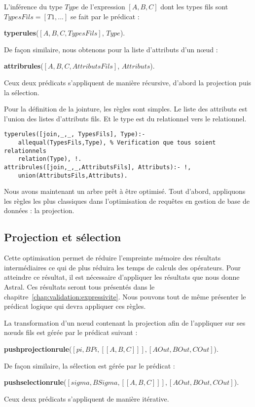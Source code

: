 \begin{regle}
L'inférence du type $Type$ de l'expression $[A,B,C]$ dont les types fils sont $TypesFils=[T1,...]$ se fait par le prédicat :
\begin{center} \textbf{typerules}($[A,B,C,TypesFils]$, $Type$).\end{center}
De façon similaire, nous obtenons pour la liste d'attributs d'un nœud :
\begin{center} \textbf{attribrules}($[A,B,C,AttributsFils]$, $Attributs$).\end{center}
Ceux deux prédicats s'appliquent de manière récursive, d'abord la projection puis la sélection.
\end{regle}


\begin{example}
	Pour la définition de la jointure, les règles sont simples. Le liste des attributs est l'union des listes d'attributs fils. Et le type est du relationnel vers le relationnel.
	\begin{lstlisting}
typerules([join,_,_, TypesFils], Type):- 
	allequal(TypesFils,Type), % Verification que tous soient relationnels 
	relation(Type), !.
attribrules([join,_,_,AttributsFils], Attributs):- !, 
	union(AttributsFils,Attributs).
	\end{lstlisting}
\end{example}

Nous avons maintenant un arbre prêt à être optimisé. Tout d'abord, appliquons les règles les plus classiques dans l'optimisation de requêtes en gestion de base de données : la projection.

\subsection{Projection et sélection}
Cette optimisation permet de réduire l'empreinte mémoire des résultats intermédiaires ce qui de plus réduira les temps de calculs des opérateurs. Pour atteindre ce résultat, il est nécessaire d'appliquer les résultats que nous donne Astral. Ces résultats seront tous présentés dans le chapitre~\ref{chap:validation:expressivite}. Nous pouvons tout de même présenter le prédicat logique qui devra appliquer ces règles.
\begin{regle}
La transformation d'un nœud contenant la projection afin de l'appliquer sur ses nœuds fils est gérée par le prédicat suivant :
\begin{center} \textbf{pushprojectionrule}($[pi,BPi,[[A,B,C]]],[AOut,BOut,COut]$).\end{center}
De façon similaire, la sélection est gérée par le prédicat :
\begin{center} \textbf{pushselectionrule}($[sigma,BSigma,[[A,B,C]]],[AOut,BOut,COut]$).\end{center}
Ceux deux prédicats s'appliquent de manière itérative.
\end{regle}

